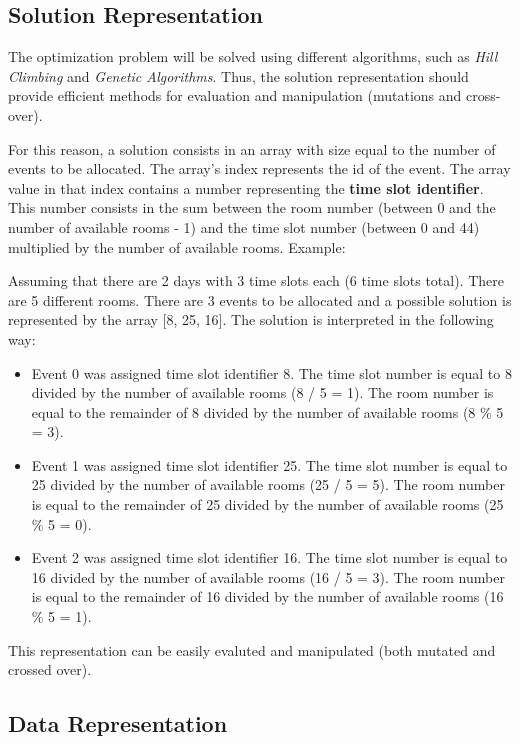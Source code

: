\documentclass[conference]{IEEEtran}
\begin{document}
\subsection{Solution Representation}

The optimization problem will be solved using different algorithms, such as \textit{Hill Climbing} and \textit{Genetic Algorithms}. Thus, the solution representation should provide efficient methods for evaluation and manipulation (mutations and cross-over).

For this reason, a solution consists in an array with size equal to the number of events to be allocated. The array's index represents the id of the event. The array value in that index contains a number representing the \textbf{time slot identifier}. This number consists in the sum between the room number (between 0 and the number of available rooms - 1) and the time slot number (between 0 and 44) multiplied by the number of available rooms. Example:

Assuming that there are 2 days with 3 time slots each (6 time slots total). There are 5 different rooms. There are 3 events to be allocated and a possible solution is represented by the array [8, 25, 16]. The solution is interpreted in the following way:

\begin{itemize}
    \item Event 0 was assigned time slot identifier 8. The time slot number is equal to 8 divided by the number of available rooms (8 / 5 = 1). The room number is equal to the remainder of 8 divided by the number of available rooms (8 \% 5 = 3).
    \item Event 1 was assigned time slot identifier 25. The time slot number is equal to 25 divided by the number of available rooms (25 / 5 = 5). The room number is equal to the remainder of 25 divided by the number of available rooms (25 \% 5 = 0).
    \item Event 2 was assigned time slot identifier 16. The time slot number is equal to 16 divided by the number of available rooms (16 / 5 = 3). The room number is equal to the remainder of 16 divided by the number of available rooms (16 \% 5 = 1).
\end{itemize}

This representation can be easily evaluted and manipulated (both mutated and crossed over).

\subsection{Data Representation}
\end{document}
